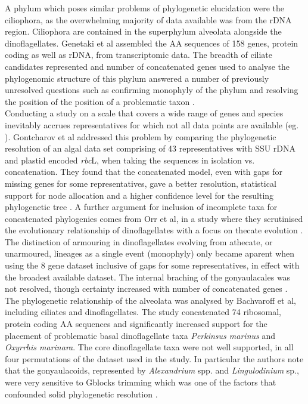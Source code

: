 \documentclass[12pt]{article}
\begin{document}
A phylum which poses similar problems of phylogenetic elucidation were the ciliophora, as the overwhelming majority of data available was from the rDNA region. Ciliophora are contained in the superphylum alveolata alongside the dinoflagellates. Genetaki et al assembled the AA sequences of 158 genes, protein coding as well as rDNA, from transcriptomic data. The breadth of ciliate candidates represented and number of concatenated genes used to analyse the phylogenomic structure of this phylum answered a number of previously unresolved questions such as confirming monophyly of the phylum and resolving the position of the position of a problematic taxon \cite{gentekaki2014large}. \\
Conducting a study on a scale that covers a wide range of genes and species inevitably accrues representatives for which not all data points are available (eg. \cite{gentekaki2014large,bachvaroff2014dinoflagellate}). Gontcharov et al addressed this problem by comparing the phylogenetic resolution of an algal data set comprising of 43 representatives with SSU rDNA and plastid encoded \textit{rbc}L, when taking the sequences in isolation vs. concatenation. They found that the concatenated model, even with gaps for missing genes for some representatives, gave a better resolution, statistical support for node allocation and a higher confidence level for the resulting phylogenetic tree \cite{gontcharov2004combined}. A further argument for inclusion of incomplete taxa for concatenated phylogenies comes from Orr et al, in a study where they scrutinised the evolutionary relationship of dinoflagellates with a focus on thecate evolution \cite{orr2012naked}. The distinction of armouring in dinoflagellates evolving from athecate, or unarmoured, lineages as a single event (monophyly) only became aparent when using the 8 gene dataset inclusive of gaps for some representatives, in effect with the broadest available dataset. The internal braching of the gonyaulacales was not resolved, though certainty increased with number of concatenated genes \cite{orr2012naked}. \\
The phylogenetic relationship of the alveolata was analysed by Bachvaroff et al, including ciliates and dinoflagellates.  The study concatenated 74 ribosomal, protein coding AA sequences and significantly increased support for the placement of problematic basal dinoflagellate taxa \textit{Perkinsus marinus } and \textit{Oxyrrhis marinara}. The core dinoflagellate taxa were not well supported, in all four permutations of the dataset used in the study. In particular the authors note that the gonyaulacoids, represented by \textit{Alexandrium} spp. and \textit{Lingulodinium} sp., were very sensitive to Gblocks trimming which was one of the factors that confounded solid phylogenetic resolution \cite{bachvaroff2014dinoflagellate}.\\
\end{document}
